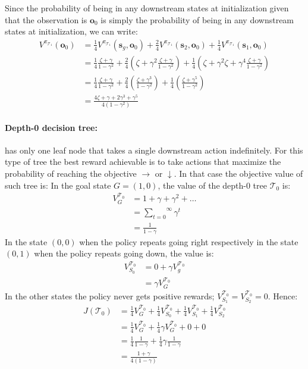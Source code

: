     Since the probability of being in any downstream states at initialization given that the observation is $\boldsymbol{o}_0$ is simply the probability of being in any downstream states at initialization, we can write:
    \begin{align*}
        V^{\pi_{\mathcal{T}_1}} (\boldsymbol{o}_0) &= \frac{1}{4} V^{\pi_{\mathcal{T}_1}} (\boldsymbol{s}_g, \boldsymbol{o}_0) + \frac{2}{4} V^{\pi_{\mathcal{T}_1}} (\boldsymbol{s}_2, \boldsymbol{o}_0) + \frac{1}{4} V^{\pi_{\mathcal{T}_1}} (\boldsymbol{s}_1, \boldsymbol{o}_0) \\
        &= \frac{1}{4} \frac{\zeta + \gamma}{1 - \gamma^2} + \frac{2}{4} (\zeta + \gamma^2 \frac{\zeta + \gamma}{1 - \gamma^2}) + \frac{1}{4} (\zeta + \gamma^2 \zeta + \gamma^4 \frac{\zeta + \gamma}{1 - \gamma^2}) \\
        &= \frac{1}{4} \frac{\zeta + \gamma}{1 - \gamma^2} + \frac{2}{4} (\frac{\zeta + \gamma ^ 3}{1-\gamma^2}) + \frac{1}{4}(\frac{\zeta+\gamma^5}{1-\gamma^2}) \\
        &= \frac{4\zeta + \gamma + 2\gamma^3 + \gamma^5}{4(1-\gamma^2)}
    \end{align*}

\paragraph{Depth-0 decision tree:} has only one leaf node that takes a single downstream action indefinitely.
For this type of tree the best reward achievable is to take actions that maximize the probability of reaching the objective $\rightarrow$ or $\downarrow$. In that case the objective value of such tree is:
In the goal state $G = (1, 0)$, the value of the depth-0 tree $\mathcal{T}_0$ is:
\begin{align*}
    V^{\mathcal{T}_0}_G &= 1 + \gamma + \gamma^2 + \dots \\
    &= \overset{\infty}{\underset{t=0}\sum} \gamma^t \\
    &= \frac{1}{1 - \gamma}
\end{align*}
In the state $(0, 0)$ when the policy repeats going right respectively in the state $(0, 1)$ when the policy repeats going down, the value is:
\begin{align*}
    V^{\mathcal{T}_0}_{S_0} &= 0 + \gamma V^{\mathcal{T}_0}_g \\
    &= \gamma V^{\mathcal{T}_0}_G
\end{align*}
In the other states the policy never gets positive rewards; $V^{\mathcal{T}_0}_{S_1} = V^{\mathcal{T}_0}_{S_2} = 0$. Hence:
\begin{align*}
J(\mathcal{T}_0) &= \frac{1}{4} V^{\mathcal{T}_0}_G + \frac{1}{4} V^{\mathcal{T}_0}_{S_0}+ \frac{1}{4} V^{\mathcal{T}_0}_{S_1}+ \frac{1}{4} V^{\mathcal{T}_0}_{S_2} \\
&= \frac{1}{4} V^{\mathcal{T}_0}_G + \frac{1}{4} \gamma V^{\mathcal{T}_0}_G + 0 + 0\\
&= \frac{1}{4} \frac{1}{1 - \gamma} + \frac{1}{4} \gamma \frac{1}{1 - \gamma} \\
&= \frac{1 + \gamma}{4(1 - \gamma)}
\end{align*}

